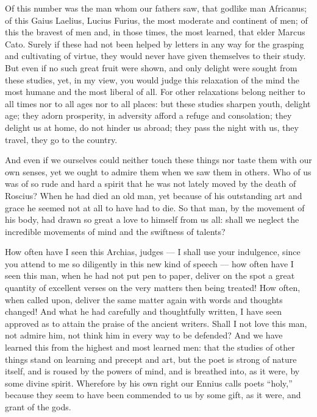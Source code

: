  Of this number was the man whom our fathers saw, that godlike man Africanus; of this Gaius Laelius, Lucius Furius, the most moderate and continent of men; of this the bravest of men and, in those times, the most learned, that elder Marcus Cato. Surely if these had not been helped by letters in any way for the grasping and cultivating of virtue, they would never have given themselves to their study. But even if no such great fruit were shown, and only delight were sought from these studies, yet, in my view, you would judge this relaxation of the mind the most humane and the most liberal of all. For other relaxations belong neither to all times nor to all ages nor to all places: but these studies sharpen youth, delight age; they adorn prosperity, in adversity afford a refuge and consolation; they delight us at home, do not hinder us abroad; they pass the night with us, they travel, they go to the country.

 And even if we ourselves could neither touch these things nor taste them with our own senses, yet we ought to admire them when we saw them in others. Who of us was of so rude and hard a spirit that he was not lately moved by the death of Roscius? When he had died an old man, yet because of his outstanding art and grace he seemed not at all to have had to die. So that man, by the movement of his body, had drawn so great a love to himself from us all: shall we neglect the incredible movements of mind and the swiftness of talents?

 How often have I seen this Archias, judges --- I shall use your indulgence, since you attend to me so diligently in this new kind of speech --- how often have I seen this man, when he had not put pen to paper, deliver on the spot a great quantity of excellent verses on the very matters then being treated! How often, when called upon, deliver the same matter again with words and thoughts changed! And what he had carefully and thoughtfully written, I have seen approved as to attain the praise of the ancient writers. Shall I not love this man, not admire him, not think him in every way to be defended? And we have learned this from the highest and most learned men: that the studies of other things stand on learning and precept and art, but the poet is strong of nature itself, and is roused by the powers of mind, and is breathed into, as it were, by some divine spirit. Wherefore by his own right our Ennius calls poets ``holy,'' because they seem to have been commended to us by some gift, as it were, and grant of the gods.

